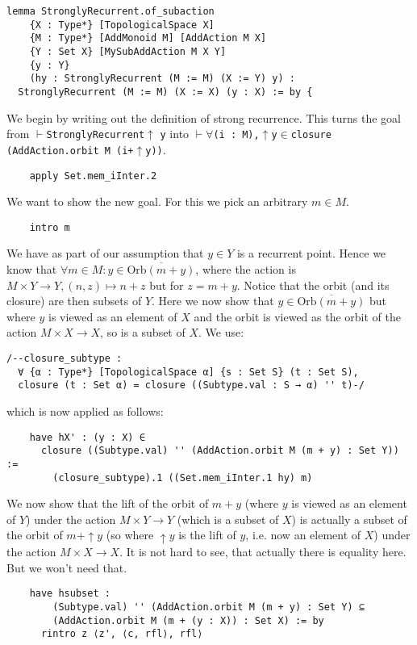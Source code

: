 \documentclass[11pt]{article}
\theoremstyle{definition}              %
\theoremstyle{definition}              %
\theoremstyle{definition}              %
\begin{document}
\begin{lstlisting}
lemma StronglyRecurrent.of_subaction
    {X : Type*} [TopologicalSpace X]
    {M : Type*} [AddMonoid M] [AddAction M X]
    {Y : Set X} [MySubAddAction M X Y]
    {y : Y}
    (hy : StronglyRecurrent (M := M) (X := Y) y) :
  StronglyRecurrent (M := M) (X := X) (y : X) := by {

\end{lstlisting}
We begin by writing out the definition of strong recurrence. This turns the goal from $\vdash$\verb|StronglyRecurrent|$\uparrow$ \verb|y| into $\vdash \forall$\verb|(i : M),|$\uparrow$\verb|y|$\in$\verb|closure (AddAction.orbit M (i+|$\uparrow$\verb|y))|.
\begin{lstlisting}
    apply Set.mem_iInter.2
\end{lstlisting}
We want to show the new goal. For this we pick an arbitrary $m \in M$.
\begin{lstlisting}
    intro m
\end{lstlisting}
We have as part of our assumption that $y \in Y$ is a recurrent point. Hence we know that $\forall m \in M:y \in  \overline{\text{Orb}(m+y)}$, where the action is $M \times Y \to Y, (n,z) \mapsto n+z$ but for $z=m+y$. Notice that the orbit (and its closure) are then subsets of $Y$. Here we now show that $y \in \overline{\text{Orb}(m+y)}$ but where $y$ is viewed as an element of $X$ and the orbit is viewed as the orbit of the action $M \times X \to X$, so is a subset of $X$. We use:
\begin{lstlisting}
/--closure_subtype :
  ∀ {α : Type*} [TopologicalSpace α] {s : Set S} (t : Set S),
  closure (t : Set α) = closure ((Subtype.val : S → α) '' t)-/
\end{lstlisting}
which is now applied as follows:
\begin{lstlisting}
    have hX' : (y : X) ∈
      closure ((Subtype.val) '' (AddAction.orbit M (m + y) : Set Y)) :=
        (closure_subtype).1 ((Set.mem_iInter.1 hy) m)
\end{lstlisting}
We now show that the lift of the orbit of $m+y$ (where $y$ is viewed as an element of $Y$) under the action $M \times Y \to Y$ (which is a subset of $X$) is actually a subset of the orbit of $m+\uparrow y$ (so where $\uparrow y$ is the lift of $y$, i.e. now an element of $X$) under the action $M \times X \to X$. It is not hard to see, that actually there is equality here. But we won't need that.
\begin{lstlisting}
    have hsubset :
        (Subtype.val) '' (AddAction.orbit M (m + y) : Set Y) ⊆
        (AddAction.orbit M (m + (y : X)) : Set X) := by
      rintro z ⟨z', ⟨c, rfl⟩, rfl⟩
\end{lstlisting}
\end{document}
